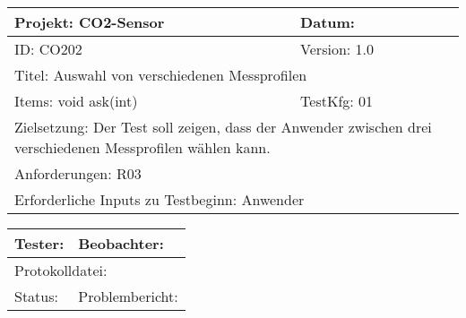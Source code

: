 \begin{table}[!hbt]
	
	\centering
	
	\begin{tabular}{|p{5cm}|p{5cm}|}
		
		\hline
		Projekt: CO2-Sensor & Datum: \\
		\hline
		ID: CO202 & Version: 1.0 \\
		\hline
		\multicolumn{2}{|l|}{Titel: Auswahl von verschiedenen Messprofilen} \\
		\hline
		Items: void ask(int) & TestKfg: 01 \\
		\hline
		\multicolumn{2}{|p{\textwidth-2\tabcolsep}|}{Zielsetzung: Der Test soll zeigen, dass der Anwender zwischen drei verschiedenen Messprofilen wählen kann.} \\
		\hline
		\multicolumn{2}{|l|}{Anforderungen: R03} \\
		\hline
		\multicolumn{2}{|l|}{Erforderliche Inputs zu Testbeginn: Anwender} \\
		\hline
		
	\end{tabular}
	
	\label{tab:Test_2}
	
\end{table}

\begin{table}[!hbt]
	
	\centering
	
	\begin{tabular}{|p{5cm}|p{5cm}|}
		
		\hline
		Tester: & Beobachter: \\
		\hline
		\multicolumn{2}{|l|}{Protokolldatei:} \\
		\hline
		Status: & Problembericht: \\
		\hline
		
	\end{tabular}
	
	\label{tab:Tester2}
	
\end{table}